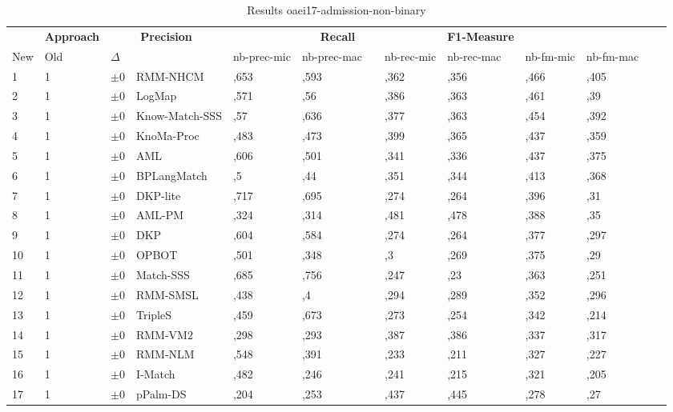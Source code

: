 \begin{table}[htb]
\setlength{\tabcolsep}{0.5em}
\centering
\scriptsize
\begin{tabular}[tb]{lllp{2.3cm}llllllllll}
\noalign{\smallskip}\hline\noalign{\smallskip}
\multicolumn{3}{c}{\textbf{Rank}}& \textbf{Approach}  & \multicolumn{2}{c}{\textbf{Precision}}  & \hspace*{1mm}  & \multicolumn{2}{c}{\textbf{Recall}}  & \hspace*{1mm}  & \multicolumn{2}{c}{\textbf{F1-Measure}}  & \hspace*{1mm} \\
New & Old & $\Delta$ & &nb-prec-mic & nb-prec-mac && nb-rec-mic & nb-rec-mac && nb-fm-mic & nb-fm-mac\\
\noalign{\smallskip}\hline\noalign{\smallskip}
1 & 1 		& $\pm$0 &RMM-NHCM    	&	,653 & ,593 & & ,362 & ,356 & & ,466 & ,405\\
2 & 1 		& $\pm$0 &LogMap    	&	,571 & ,56 & & ,386 & ,363 & & ,461 & ,39\\
3 & 1 		& $\pm$0 &Know-Match-SSS    	&	,57 & ,636 & & ,377 & ,363 & & ,454 & ,392\\
4 & 1 		& $\pm$0 &KnoMa-Proc    	&	,483 & ,473 & & ,399 & ,365 & & ,437 & ,359\\
5 & 1 		& $\pm$0 &AML    	&	,606 & ,501 & & ,341 & ,336 & & ,437 & ,375\\
6 & 1 		& $\pm$0 &BPLangMatch    	&	,5 & ,44 & & ,351 & ,344 & & ,413 & ,368\\
7 & 1 		& $\pm$0 &DKP-lite    	&	,717 & ,695 & & ,274 & ,264 & & ,396 & ,31\\
8 & 1 		& $\pm$0 &AML-PM    	&	,324 & ,314 & & ,481 & ,478 & & ,388 & ,35\\
9 & 1 		& $\pm$0 &DKP    	&	,604 & ,584 & & ,274 & ,264 & & ,377 & ,297\\
10 & 1 		& $\pm$0 &OPBOT    	&	,501 & ,348 & & ,3 & ,269 & & ,375 & ,29\\
11 & 1 		& $\pm$0 &Match-SSS    	&	,685 & ,756 & & ,247 & ,23 & & ,363 & ,251\\
12 & 1 		& $\pm$0 &RMM-SMSL    	&	,438 & ,4 & & ,294 & ,289 & & ,352 & ,296\\
13 & 1 		& $\pm$0 &TripleS    	&	,459 & ,673 & & ,273 & ,254 & & ,342 & ,214\\
14 & 1 		& $\pm$0 &RMM-VM2    	&	,298 & ,293 & & ,387 & ,386 & & ,337 & ,317\\
15 & 1 		& $\pm$0 &RMM-NLM    	&	,548 & ,391 & & ,233 & ,211 & & ,327 & ,227\\
16 & 1 		& $\pm$0 &I-Match    	&	,482 & ,246 & & ,241 & ,215 & & ,321 & ,205\\
17 & 1 		& $\pm$0 &pPalm-DS    	&	,204 & ,253 & & ,437 & ,445 & & ,278 & ,27\\
\end{tabular}
\caption{Results oaei17-admission-non-binary}
\label{tbl:results}
\end{table}